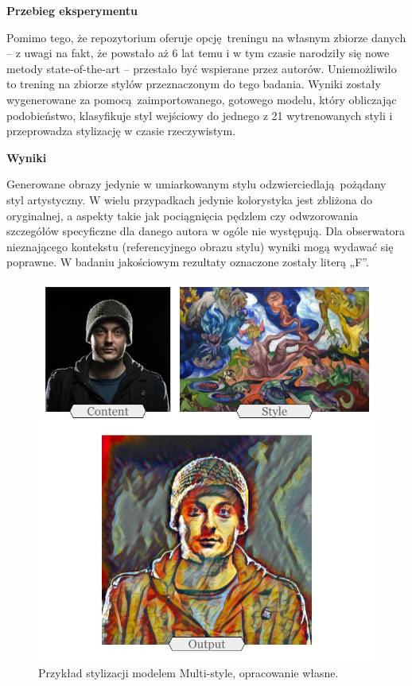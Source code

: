 \documentclass[12pt]{article}
\begin{document}
\noindent\textbf{Przebieg eksperymentu}

Pomimo tego, że repozytorium oferuje opcję treningu na własnym zbiorze danych – z uwagi na fakt, że powstało aż 6 lat temu i w tym czasie narodziły się nowe metody state-of-the-art – przestało być wspierane przez autorów. Uniemożliwiło to trening na zbiorze stylów przeznaczonym do tego badania. Wyniki zostały wygenerowane za pomocą zaimportowanego, gotowego modelu, który obliczając podobieństwo, klasyfikuje styl wejściowy do jednego z 21 wytrenowanych styli i przeprowadza stylizację w czasie rzeczywistym.

\noindent\textbf{Wyniki}

Generowane obrazy jedynie w umiarkowanym stylu odzwierciedlają pożądany styl artystyczny. W wielu przypadkach jedynie kolorystyka jest zbliżona do oryginalnej, a aspekty takie jak pociągnięcia pędzlem czy odwzorowania szczegółów specyficzne dla danego autora w ogóle nie występują. Dla obserwatora nieznającego kontekstu (referencyjnego obrazu stylu) wyniki mogą wydawać się poprawne. W badaniu jakościowym rezultaty oznaczone zostały literą „F”.

\begin{figure}[H]
    \centering
    \includegraphics[scale=0.45]{u24.png}
    \caption{Przykład stylizacji modelem Multi-style, opracowanie własne.}
    \label{fig:16:1}
\end{figure}
\end{document}
